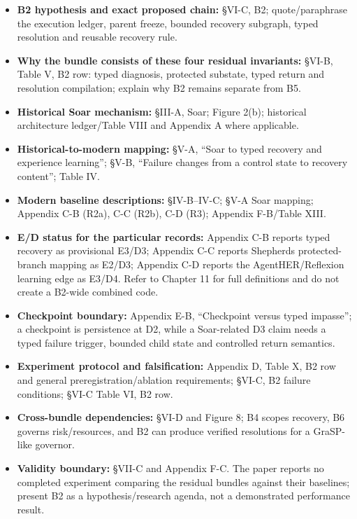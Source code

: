 \begin{itemize}
\tightlist
\item
  \textbf{B2 hypothesis and exact proposed chain:} §VI-C, B2; quote/paraphrase the execution ledger, parent freeze, bounded recovery subgraph, typed resolution and reusable recovery rule.
\item
  \textbf{Why the bundle consists of these four residual invariants:} §VI-B, Table V, B2 row: typed diagnosis, protected substate, typed return and resolution compilation; explain why B2 remains separate from B5.
\item
  \textbf{Historical Soar mechanism:} §III-A, Soar; Figure 2(b); historical architecture ledger/Table VIII and Appendix A where applicable.
\item
  \textbf{Historical-to-modern mapping:} §V-A, ``Soar to typed recovery and experience learning''; §V-B, ``Failure changes from a control state to recovery content''; Table IV.
\item
  \textbf{Modern baseline descriptions:} §IV-B--IV-C; §V-A Soar mapping; Appendix C-B (R2a), C-C (R2b), C-D (R3); Appendix F-B/Table XIII.
\item
  \textbf{E/D status for the particular records:} Appendix C-B reports typed recovery as provisional E3/D3; Appendix C-C reports Shepherd\textquotesingle s protected-branch mapping as E2/D3; Appendix C-D reports the AgentHER/Reflexion learning edge as E3/D4. Refer to Chapter 11 for full definitions and do not create a B2-wide combined code.
\item
  \textbf{Checkpoint boundary:} Appendix E-B, ``Checkpoint versus typed impasse''; a checkpoint is persistence at D2, while a Soar-related D3 claim needs a typed failure trigger, bounded child state and controlled return semantics.
\item
  \textbf{Experiment protocol and falsification:} Appendix D, Table X, B2 row and general preregistration/ablation requirements; §VI-C, B2 failure conditions; §VI-C Table VI, B2 row.
\item
  \textbf{Cross-bundle dependencies:} §VI-D and Figure 8; B4 scopes recovery, B6 governs risk/resources, and B2 can produce verified resolutions for a GraSP-like governor.
\item
  \textbf{Validity boundary:} §VII-C and Appendix F-C. The paper reports no completed experiment comparing the residual bundles against their baselines; present B2 as a hypothesis/research agenda, not a demonstrated performance result.
\end{itemize}

